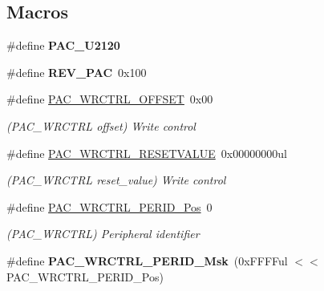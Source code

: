 \subsection*{Macros}
\begin{DoxyCompactItemize}
\item 
\hypertarget{group___s_a_m_l21___p_a_c_gafc4817e927b730cc6c3c00130d58383d}{}\#define {\bfseries P\+A\+C\+\_\+\+U2120}\label{group___s_a_m_l21___p_a_c_gafc4817e927b730cc6c3c00130d58383d}

\item 
\hypertarget{group___s_a_m_l21___p_a_c_gae5cdafc1f439a00abc501cacc09f6013}{}\#define {\bfseries R\+E\+V\+\_\+\+P\+A\+C}~0x100\label{group___s_a_m_l21___p_a_c_gae5cdafc1f439a00abc501cacc09f6013}

\item 
\hypertarget{group___s_a_m_l21___p_a_c_ga37963dbce03e6a2686f45d67f70539d5}{}\#define \hyperlink{group___s_a_m_l21___p_a_c_ga37963dbce03e6a2686f45d67f70539d5}{P\+A\+C\+\_\+\+W\+R\+C\+T\+R\+L\+\_\+\+O\+F\+F\+S\+E\+T}~0x00\label{group___s_a_m_l21___p_a_c_ga37963dbce03e6a2686f45d67f70539d5}

\begin{DoxyCompactList}\small\item\em (P\+A\+C\+\_\+\+W\+R\+C\+T\+R\+L offset) Write control \end{DoxyCompactList}\item 
\hypertarget{group___s_a_m_l21___p_a_c_ga903fbff5f9673c0eda0d3309bbb78b34}{}\#define \hyperlink{group___s_a_m_l21___p_a_c_ga903fbff5f9673c0eda0d3309bbb78b34}{P\+A\+C\+\_\+\+W\+R\+C\+T\+R\+L\+\_\+\+R\+E\+S\+E\+T\+V\+A\+L\+U\+E}~0x00000000ul\label{group___s_a_m_l21___p_a_c_ga903fbff5f9673c0eda0d3309bbb78b34}

\begin{DoxyCompactList}\small\item\em (P\+A\+C\+\_\+\+W\+R\+C\+T\+R\+L reset\+\_\+value) Write control \end{DoxyCompactList}\item 
\hypertarget{group___s_a_m_l21___p_a_c_ga3dc9ff0a036088acbcfa5f449a5d822e}{}\#define \hyperlink{group___s_a_m_l21___p_a_c_ga3dc9ff0a036088acbcfa5f449a5d822e}{P\+A\+C\+\_\+\+W\+R\+C\+T\+R\+L\+\_\+\+P\+E\+R\+I\+D\+\_\+\+Pos}~0\label{group___s_a_m_l21___p_a_c_ga3dc9ff0a036088acbcfa5f449a5d822e}

\begin{DoxyCompactList}\small\item\em (P\+A\+C\+\_\+\+W\+R\+C\+T\+R\+L) Peripheral identifier \end{DoxyCompactList}\item 
\hypertarget{group___s_a_m_l21___p_a_c_gaaee03714b7806d6744292cb9eabb450c}{}\#define {\bfseries P\+A\+C\+\_\+\+W\+R\+C\+T\+R\+L\+\_\+\+P\+E\+R\+I\+D\+\_\+\+Msk}~(0x\+F\+F\+F\+Ful $<$$<$ P\+A\+C\+\_\+\+W\+R\+C\+T\+R\+L\+\_\+\+P\+E\+R\+I\+D\+\_\+\+Pos)\label{group___s_a_m_l21___p_a_c_gaaee03714b7806d6744292cb9eabb450c}


\end{DoxyCompactItemize}
